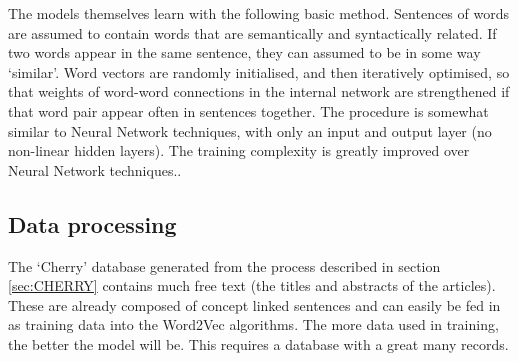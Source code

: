 \documentclass[11pt, oneside]{article}   	%
\begin{document}
The models themselves learn with the following basic method. Sentences of words are assumed to contain words that are semantically and syntactically related. If two words appear in the same sentence, they can assumed to be in some way `similar'. Word vectors are randomly initialised, and then iteratively optimised, so that weights of word-word connections in the internal network are strengthened if that word pair appear often in sentences together. The procedure is somewhat similar to Neural Network techniques, with only an input and output layer (no non-linear hidden layers). The training complexity is greatly improved over Neural Network techniques.\cite{WORD2VEC}.

\subsection{Data processing}
\label{sec:DATAPROC}
The `Cherry' database generated from the process described in section \ref{sec:CHERRY} contains much free text (the titles and abstracts of the articles). These are already composed of concept linked sentences and can easily be fed in as training data into the Word2Vec algorithms. The more data used in training, the better the model will be. This requires a database with a great many records\cite{HEWHOHASDATA}\cite{WORD2VEC}. 
\end{document}
